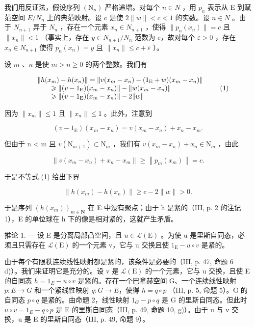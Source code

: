 我们用反证法，假设序列 \((\mathrm{N}_{n})\) 严格递增。对每个 \(n \in N\) ，用 \(p_{n}\) 表示从 E 到赋范空间 \(E/N_{n}\) 上的典范映射。设 c 是使 \(2\|w\| < c < 1\) 的实数。设 \(n \in N\) 。由于 \(N_{n+1}\) 异于 \(N_{n}\) ，存在一个元素 \(x_{n} \in N_{n+1}\) ，使得 \(\|p_{n}(x_{n})\| = c\) 且 \(\|x_{n}\| < 1\) （事实上，存在 \(y \in N_{n+1}/N_{n}\) 范数为 c，故对每个 \(\varepsilon > 0\) ，存在 \(x_{n} \in N_{n+1}\) 使得 \(p_{n}(x_{n}) = y\) 且 \(\|x_{n}\| \leqslant c + \varepsilon\) ）。

设 \(m\) 、\(n\) 是使 \(m > n \geqslant 0\) 的两个整数。我们有

\[
\begin{array}{r l} & {\| h (x _ {m}) - h (x _ {n}) \| = \| v (x _ {m} - x _ {n}) - (1 _ {\mathrm{E}} + w) (x _ {m} - x _ {n}) \|} \\ & {\qquad \geqslant \| (v - 1 _ {\mathrm{E}}) (x _ {m} - x _ {n}) \| - \| w (x _ {m} - x _ {n}) \|} \\ & {\qquad \geqslant \| (v - 1 _ {\mathrm{E}}) (x _ {m} - x _ {n}) \| - 2 \| w \|} \end{array}\tag{1}
\]

因为 \(\| x_m\| \leqslant 1\) 且 \(\| x_n\| \leqslant 1\) 。此外，注意到

\[
(v - 1 _ {\mathrm{E}}) (x _ {m} - x _ {n}) = v (x _ {m} - x _ {n}) + x _ {n} - x _ {m}.
\]

但由于 n \textless{} m 且 \(v(\mathrm{N}_{m+1}) \subset \mathrm{N}_{m}\) ，我们有 \(v(x_{m} - x_{n}) + x_{n} \in \mathrm{N}_{m}\) ，由此

\[
\left\| v (x _ {m} - x _ {n}) + x _ {n} - x _ {m} \right\| \geqslant \left\| p _ {m} (x _ {m}) \right\| = c.
\]

于是不等式 (1) 给出下界

\[
\left\| h \left(x _ {m}\right) - h \left(x _ {n}\right) \right\| \geqslant c - 2 \| w \| > 0.\tag{2}
\]

于是序列 \((h(x_{m}))_{m\in\mathbf{N}}\) 在 E 中没有聚点；由于 h 是紧的（III, p. 2 的注记 1），E 的单位球在 h 下的像是相对紧的，这就产生矛盾。

推论 1. --- 设 E 是分离局部凸空间，且 \(u \in \mathcal{L}(\mathrm{E})\) 。为使 u 是里斯自同态，必须且只需存在 \(\mathcal{L}(\mathrm{E})\) 的一个元素 v，它与 u 交换且使 \(1_{\mathrm{E}} - u \circ v\) 是紧的。

由于每个有限秩连续线性映射都是紧的，该条件是必要的（III, p. 47, 命题 6 d)）。我们来证明它是充分的。设 v 是 \(\mathcal{L}(\mathrm{E})\) 的一个元素，它与 u 交换，且使 E 的自同态 \(h = 1_{E} - u \circ v\) 是紧的。存在一个巴拿赫空间 G、一个连续线性映射 \(p: E \to G\) 和一个紧线性映射 \(q: G \to E\)，使得 \(h = q \circ p\) （III, p. 5, 命题 5）。G 的自同态 \(p \circ q\) 是紧的。由命题 2，线性映射 \(1_{G} - p \circ q\) 是 G 的里斯自同态。但此时 \(u \circ v = 1_{E} - q \circ p\) 是 E 的里斯自同态（III, p. 49, 命题 10, g)）。由于 u 与 v 交换，u 是 E 的里斯自同态（III, p. 49, 命题 9）。

